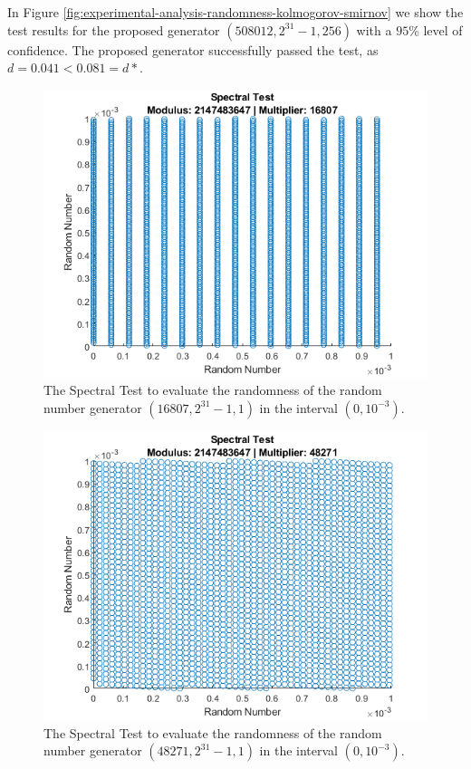 \begin{itemize}
	In Figure \ref{fig:experimental-analysis-randomness-kolmogorov-smirnov} we show the test results for the proposed generator $(508012,2^{31}-1, 256)$ with a $95\%$ level of confidence.
	The proposed generator successfully passed the test, as $d=0.041<0.081=d*$.
	
\end{itemize}

\begin{figure}
  \label{fig:evaluation-randomness-spectral-16807}
  \includegraphics[width=\columnwidth]{fig/evaluation-randomness-spectral-16807}
  \caption{The Spectral Test to evaluate the randomness of the random number generator $(16807,2^{31}-1, 1)$ in the interval $(0, 10^{-3})$.}
\end{figure}

\begin{figure}
	\label{fig:evaluation-randomness-spectral-48271}
	\includegraphics[width=\columnwidth]{fig/evaluation-randomness-spectral-48271}
	\caption{The Spectral Test to evaluate the randomness of the random number generator $(48271,2^{31}-1, 1)$ in the interval $(0, 10^{-3})$.}
\end{figure}

